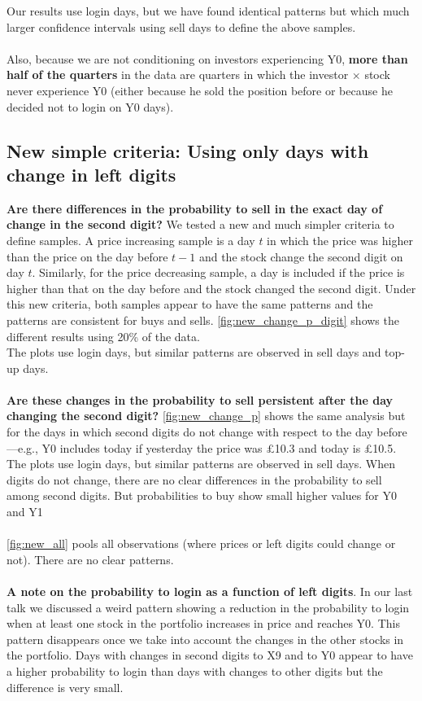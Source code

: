 \documentclass[
	USenglish,12pt,paper=a4,numbers=noenddot,abstract=on,
	final,%
	fullsample,
    ]{scrartcl}
\begin{document}
Our results use login days, but we have found identical patterns but which much larger confidence intervals using sell days to define the above samples. \\ \\
Also, because we are not conditioning on investors experiencing Y0,\textbf{ more than half of the quarters} in the data are quarters in which the investor $\times$ stock never experience Y0 (either because he sold the position before or because he decided not to login on Y0 days).
\subsection{New simple criteria: Using only days with change in left digits}
\textbf{Are there differences in the probability to sell in the exact day of change in the second digit?}
We tested a new and much simpler criteria to define samples. A price increasing sample is a day $t$ in which the price was higher than the price on the day before $t-1$ and the stock change the second digit on day $t$. Similarly, for the price decreasing sample, a day is included if the price is higher than that on the day before and the stock changed the second digit. Under this new criteria, both samples appear to have the same patterns and the patterns are consistent for buys and sells. \ref{fig:new_change_p_digit} shows the different results using 20\% of the data. \\
The plots use login days, but similar patterns are observed in sell days and top-up days.
\\ \\
\textbf{Are these changes in the probability to sell persistent after the day changing the second digit?} \ref{fig:new_change_p} shows the same analysis but for the days in which  second digits do not change with respect to the day before---e.g., Y0 includes today if yesterday the price was £10.3 and today is £10.5. \\
The plots use login days, but similar patterns are observed in sell days. When digits do not change, there are no clear differences in the probability to sell among second digits. But probabilities to buy show small higher values for Y0 and Y1
 \\ \\
 \ref{fig:new_all} pools all observations (where prices or left digits could change or not). There are no clear patterns.
 \\ \\
\textbf{A note on the probability to login as a function of left digits}.
In our last talk we discussed a weird pattern showing a reduction in the probability to login when at least one stock in the portfolio increases in price and reaches Y0. This pattern disappears once we take into account the changes in the other stocks in the portfolio. Days with changes in second digits to X9 and to Y0 appear to have a higher probability to login than days with changes to other digits but the difference is very small.
\end{document}
